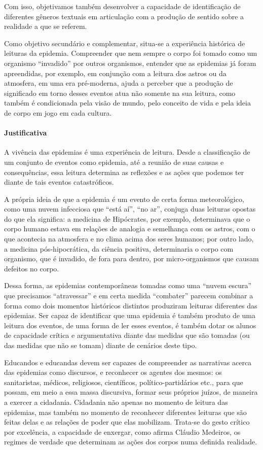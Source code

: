 \documentclass[12pt]{extarticle}
\begin{document}
Com isso, objetivamos também desenvolver a capacidade de identificação
de diferentes gêneros textuais em articulação com a produção de sentido
sobre a realidade a que se referem.

Como objetivo secundário e complementar, situa-se a experiência
histórica de leituras da epidemia. Compreender que nem sempre o corpo
foi tomado como um organismo ``invadido'' por outros organismos,
entender que as epidemias já foram apreendidas, por exemplo, em
conjunção com a leitura dos astros ou da atmosfera, em uma era
pré-moderna, ajuda a perceber que a produção de significado em torno
desses eventos atua não somente na sua leitura, como também é
condicionada pela visão de mundo, pelo conceito de vida e pela ideia de
corpo em jogo em cada cultura.

\paragraph{Justificativa}

A vivência das epidemias é uma experiência de leitura. Desde a
classificação de um conjunto de eventos como epidemia, até a reunião de
suas causas e consequências, essa leitura determina as reflexões e as
ações que podemos ter diante de tais eventos catastróficos.

A própria ideia de que a epidemia é um evento de certa forma
meteorológico, como uma nuvem infecciosa que ``está aí'', ``no ar'',
conjuga duas leituras opostas do que ela significa: a medicina de
Hipócrates, por exemplo, determinava que o corpo humano estava em
relações de analogia e semelhança com os astros, com o que acontecia na
atmosfera e no clima acima dos seres humanos; por outro lado, a medicina
pós-hipocrática, da ciência positiva, determinaria o corpo com
organismo, que é invadido, de fora para dentro, por micro-organismos que
causam defeitos no corpo.

Dessa forma, as epidemias contemporâneas tomadas como uma ``nuvem
escura'' que precisamos ``atravessar'' e em certa medida ``combater''
parecem combinar a forma como dois momentos históricos distintos
produziram leituras diferentes das epidemias. Ser capaz de identificar
que uma epidemia é também produto de uma leitura dos eventos, de uma
forma de ler esses eventos, é também dotar os alunos de capacidade
crítica e argumentativa diante das medidas que são tomadas (ou das
medidas que não se tomam) diante de cenários deste tipo.

Educandos e educandas devem ser capazes de compreender as narrativas
acerca das epidemias como discursos, e reconhecer os agentes dos mesmos:
os sanitaristas, médicos, religiosos, científicos, político-partidários
etc., para que possam, em meio a essa massa discursiva, formar seus
próprios juízos, de maneira a exercer a cidadania. Cidadania não apenas
no momento de leitura das epidemias, mas também no momento de reconhecer
diferentes leituras que são feitas delas e as relações de poder que elas
mobilizam. Trata-se do gesto crítico por excelência, a capacidade de
enxergar, como afirma Cláudio Medeiros, os regimes de verdade que
determinam as ações dos corpos numa definida realidade.
\end{document}
